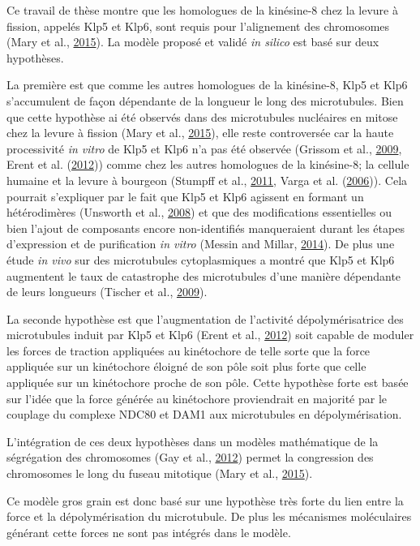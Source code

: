 \documentclass[12pt,a4paper,twoside,openright]{book}
\begin{document}
Ce travail de thèse montre que les homologues de la kinésine-8 chez la
levure à fission, appelés Klp5 et Klp6, sont requis pour l'alignement
des chromosomes (Mary et al., \hyperref[ref-Mary2015]{2015}). La modèle
proposé et validé \emph{in silico} est basé sur deux hypothèses.

La première est que comme les autres homologues de la kinésine-8, Klp5
et Klp6 s'accumulent de façon dépendante de la longueur le long des
microtubules. Bien que cette hypothèse ai été observés dans des
microtubules nucléaires en mitose chez la levure à fission (Mary et al.,
\hyperref[ref-Mary2015]{2015}), elle reste controversée car la haute
processivité \emph{in vitro} de Klp5 et Klp6 n'a pas été observée
(Grissom et al., \hyperref[ref-Grissom2009]{2009}, Erent et al.
(\hyperref[ref-Erent2012]{2012})) comme chez les autres homologues de la
kinésine-8; la cellule humaine et la levure à bourgeon (Stumpff et al.,
\hyperref[ref-Stumpff2011a]{2011}, Varga et al.
(\hyperref[ref-Varga2006]{2006})). Cela pourrait s'expliquer par le fait
que Klp5 et Klp6 agissent en formant un hétérodimères (Unsworth et al.,
\hyperref[ref-Unsworth2008]{2008}) et que des modifications essentielles
ou bien l'ajout de composants encore non-identifiés manqueraient durant
les étapes d'expression et de purification \emph{in vitro} (Messin and
Millar, \hyperref[ref-Messin2014]{2014}). De plus une étude \emph{in
vivo} sur des microtubules cytoplasmiques a montré que Klp5 et Klp6
augmentent le taux de catastrophe des microtubules d'une manière
dépendante de leurs longueurs (Tischer et al.,
\hyperref[ref-Tischer2009]{2009}).

La seconde hypothèse est que l'augmentation de l'activité
dépolymérisatrice des microtubules induit par Klp5 et Klp6 (Erent et
al., \hyperref[ref-Erent2012]{2012}) soit capable de moduler les forces
de traction appliquées au kinétochore de telle sorte que la force
appliquée sur un kinétochore éloigné de son pôle soit plus forte que
celle appliquée sur un kinétochore proche de son pôle. Cette hypothèse
forte est basée sur l'idée que la force générée au kinétochore
proviendrait en majorité par le couplage du complexe NDC80 et DAM1 aux
microtubules en dépolymérisation.

L'intégration de ces deux hypothèses dans un modèles mathématique de la
ségrégation des chromosomes (Gay et al., \hyperref[ref-Gay2012a]{2012})
permet la congression des chromosomes le long du fuseau mitotique (Mary
et al., \hyperref[ref-Mary2015]{2015}).

Ce modèle gros grain est donc basé sur une hypothèse très forte du lien
entre la force et la dépolymérisation du microtubule. De plus les
mécanismes moléculaires générant cette forces ne sont pas intégrés dans
le modèle.
\end{document}

